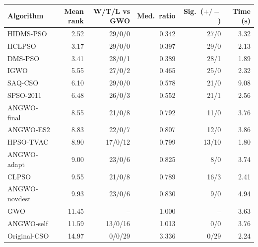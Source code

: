 \begin{tabular}{lrrrrr}
\toprule
Algorithm & Mean rank & W/T/L vs GWO & Med.\ ratio & Sig.\ ($+/-$) & Time (s)\\
\midrule
HIDMS-PSO & 2.52 & 29/0/0 & 0.342 & 27/0 & 3.32 \\
HCLPSO & 3.17 & 29/0/0 & 0.397 & 29/0 & 2.13 \\
DMS-PSO & 3.41 & 28/0/1 & 0.389 & 28/1 & 1.89 \\
IGWO & 5.55 & 27/0/2 & 0.465 & 25/0 & 2.32 \\
SAQ-CSO & 6.10 & 29/0/0 & 0.578 & 21/0 & 9.08 \\
SPSO-2011 & 6.48 & 26/0/3 & 0.552 & 21/1 & 2.56 \\
ANGWO-final & 8.55 & 21/0/8 & 0.792 & 11/0 & 3.76 \\
ANGWO-ES2 & 8.83 & 22/0/7 & 0.807 & 12/0 & 3.86 \\
HPSO-TVAC & 8.90 & 17/0/12 & 0.799 & 13/10 & 1.80 \\
ANGWO-adapt & 9.00 & 23/0/6 & 0.825 & 8/0 & 3.74 \\
CLPSO & 9.55 & 21/0/8 & 0.789 & 16/3 & 2.41 \\
ANGWO-novdest & 9.93 & 23/0/6 & 0.830 & 9/0 & 4.94 \\
GWO & 11.45 & -- & 1.000 & -- & 3.63 \\
ANGWO-self & 11.59 & 13/0/16 & 1.013 & 0/0 & 3.76 \\
Original-CSO & 14.97 & 0/0/29 & 3.336 & 0/29 & 2.24 \\
\bottomrule
\end{tabular}
